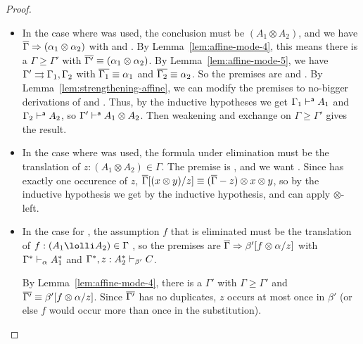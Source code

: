 \begin{proof}
\begin{itemize}
\item In the case where \FR\/ was used, the conclusion must be $(A_1
  \otimes A_2)$, and we have $\overline{\Gamma} \Rightarrow (\alpha_1 \otimes
  \alpha_2)$ with  and
  .  By Lemma~\ref{lem:affine-mode-4},
  this means there is a $\Gamma \ge \Gamma'$ with $\overline{\Gamma'} \equiv
  (\alpha_1 \otimes \alpha_2)$.  By Lemma~\ref{lem:affine-mode-5}, we
  have $\Gamma' \rightrightarrows \Gamma_1,\Gamma_2$ with $\overline{\Gamma_1} \equiv
  \alpha_1$ and $\overline{\Gamma_2} \equiv \alpha_2$. So the premises are
   and
  .  By
  Lemma~\ref{lem:strengthening-affine}, we can modify the premises to
  no-bigger derivations of  and
  .  Thus, by the inductive
  hypotheses we get $\Gamma_1 \vdash^{\mathsf{a}} A_1$ and $\Gamma_2 \vdash^{\mathsf{a}} A_2$,
  so $\Gamma' \vdash^{\mathsf{a}} A_1 \otimes A_2$.  Then weakening and exchange on
  $\Gamma \ge \Gamma'$ gives the result.

\item 
  In the case where \FL\/ was used, the formula under elimination must
  be the translation of $z:(A_1 \otimes A_2) \in \Gamma$. The premise is
  ,
  and we want .  Since \vars{\Gamma} has exactly one
  occurence of $z$, $\overline{\Gamma}[(x \otimes y)/z] \equiv
  (\overline{\Gamma}-z)\otimes x \otimes y$, so by the inductive hypothesis
  we get  by the inductive hypothesis, and
  can apply $\otimes$-left.

\item In the case for \UL, the assumption $f$ that is eliminated must be
  the translation of $f:(A_1 \lolli A_2) \in \Gamma$ , so the premises
  are $\overline{\Gamma} \Rightarrow \beta'[f \otimes \alpha/z]$ with
  $\Gamma^* \vdash_{\alpha} A_1^*$ and
  $\Gamma^*,z:A_2^* \vdash_{\beta'} C$. 

  By Lemma~\ref{lem:affine-mode-4}, there is a $\Gamma'$ with $\Gamma
  \ge \Gamma'$ and $\overline{\Gamma'} \equiv \beta'[f \otimes \alpha/z]$.
  Since $\overline{\Gamma'}$ has no duplicates, $z$ occurs at most once in
  $\beta'$ (or else $f$ would occur more than once in the substitution).
  

\end{itemize}
\end{proof}
